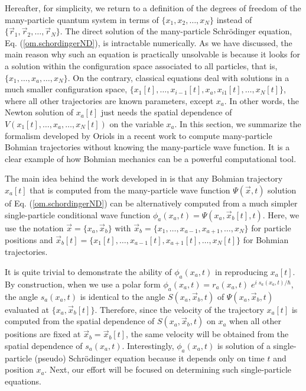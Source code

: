 \documentclass[onecolumn,nofootinbib, secnumarabic, amsmath, nobibnotes,11pt,aps,pra]{revtex4-1}
\newcommand{\eref}[1]{Eq. (\ref{#1})}
\begin{document}
Hereafter, for simplicity, we return to a definition of the degrees
of freedom of the many-particle quantum system in terms of 
$\{x_1, x_2,\ldots ,x_N\}$ instead of $\{ \vec r_1,\vec r_2, \ldots
,\vec r_N \}$. The direct solution of  the many-particle
Schr\"odinger equation, \eref{om.schordingerND}, is intractable
numerically. As we have discussed, the main reason why such an
equation is practically unsolvable is because it looks for a
solution within the configuration space associated to all particles,
that is, $\{x_1,\ldots,x_a,\ldots,x_N\}$. On the contrary, classical
equations  deal with solutions in a much smaller configuration
space,  $\{x_1[t],\ldots,x_{i -
1}[t],x_a,x_{i1}[t],\ldots,x_N[t]\}$, where all other trajectories
are known parameters, except $x_a$. In other words, the Newton
solution of $x_a[t]$ just needs the spatial dependence of
$V(x_1[t],\ldots,x_a,\ldots,x_N[t])$ on the variable $x_a$. In this
section, we summarize the formalism developed by Oriols in a recent work
\cite{om.oriolsprl} to compute many-particle Bohmian trajectories
without knowing the many-particle wave function. It is a clear
example of how Bohmian mechanics can be a powerful computational 
tool.

The main idea behind the work developed in \cite{om.oriolsprl} is
that any Bohmian trajectory $x_a[t]$ that is computed from the
many-particle wave function $\Psi(\vec x,t)$ solution of
\eref{om.schordingerND} can be alternatively computed from a much
simpler single-particle conditional wave function $\phi_a(x_a,t) = \Psi(x_a,\vec
x_b[t],t)$. Here, we use the notation $\vec x = \{x_a,\vec x_b\}$
with $\vec x_b = \{x_1,\ldots,x_{a-1},x_{a + 1},\ldots,x_N\}$ for
particle positions and $\vec x_b[t] =
\{x_1[t],\ldots,x_{a-1}[t],x_{a + 1}[t],\ldots,x_N[t]\}$ for Bohmian
trajectories.

It is quite trivial to demonstrate the ability of $\phi_a(x_a,t)$ in
reproducing $x_a[t]$. By construction, when we use a polar form
$\phi_a(x_a,t) = r_a(x_a,t) \; e^{i \; s_a(x_a,t)/\hbar}$, the angle
$s_a(x_a,t)$ is identical to the angle $S(x_a,\vec x_b,t)$ of
$\Psi(x_a,\vec x_b,t)$ evaluated at $\{x_a,\vec x_b[t]\}$.
Therefore, since the velocity of the trajectory $x_a[t]$ is computed
from the spatial dependence of $S(x_a,\vec x_b,t)$ on $x_a$ when all
other positions are fixed at $\vec x_b = \vec x_b[t]$, the same
velocity will be obtained from the spatial dependence of
$s_a(x_a,t)$. Interestingly, $\phi_a(x_a,t)$ is solution of a
single-particle (pseudo) Schr\"odinger equation because it depends
only on time $t$ and position $x_a$. Next, our effort will be
focused on determining such single-particle  equations.
\end{document}
